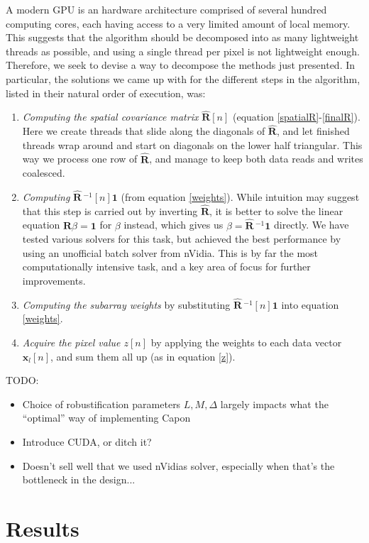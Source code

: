 \documentclass[10pt,a4paper]{article}
\renewcommand\vec[1]{\boldsymbol{#1}}
\newcommand\mat[1]{\boldsymbol{#1}}
\newcommand\1{\vec 1}
\newcommand*\x{\vec x}
\newcommand*\R{\mat R}
\newcommand*\eR{\mat{\hat R}}
\newcommand*\eRi{\hat{\mat R}\,\!^{-1}}
\begin{document}
A modern \gls{GPU} is an hardware architecture comprised of several hundred computing cores, each having access to a very limited amount of local memory. This suggests that the algorithm should be decomposed into as many lightweight threads as possible, and using a single thread per pixel is not lightweight enough. Therefore, we seek to devise a way to decompose the methods just presented. In particular, the solutions we came up with for the different steps in the algorithm, listed in their natural order of execution, was:
\begin{enumerate}
\item \emph{Computing the spatial covariance matrix} $\eR[n]$ (equation \ref{spatialR}-\ref{finalR}). Here we create threads that slide along the diagonals of $\eR$, and let finished threads wrap around and start on diagonals on the lower half triangular. This way we process one row of $\eR$, and manage to keep both data reads and writes coalesced.
\item \emph{Computing} $\eRi[n]\1$ (from equation \ref{weights}). While intuition may suggest that this step is carried out by inverting $\eR$, it is better to solve the linear equation $\R\beta = \1$ for $\beta$ instead, which gives us $\beta = \eRi\1$ directly. We have tested various solvers for this task, but achieved the best performance by using an unofficial batch solver from nVidia. This is by far the most computationally intensive task, and a key area of focus for further improvements.
\item \emph{Computing the subarray weights} by substituting $\eRi[n]\1$ into equation \ref{weights}.
\item \emph{Acquire the pixel value $z[n]$} by applying the weights to each data vector $\x_l[n]$, and sum them all up (as in equation \ref{z}).
\end{enumerate}


TODO:
\begin{itemize}
\item Choice of robustification parameters $L,M,\Delta$ largely impacts what the ``optimal'' way of implementing Capon 
\item Introduce CUDA, or ditch it?
\item Doesn't sell well that we used nVidias solver, especially when that's the bottleneck in the design...
\end{itemize}


\section{Results}
\end{document}
